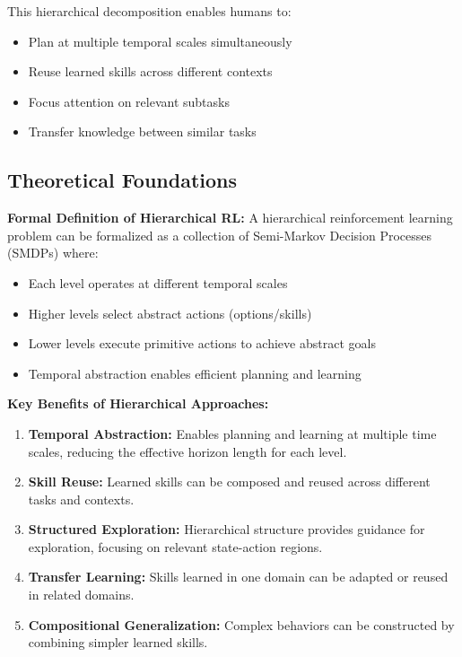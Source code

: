 \documentclass[12pt]{article}
\begin{document}
{{This hierarchical decomposition enables humans to:
\begin{itemize}
    \item Plan at multiple temporal scales simultaneously
    \item Reuse learned skills across different contexts
    \item Focus attention on relevant subtasks
    \item Transfer knowledge between similar tasks
\end{itemize}

\subsection{Theoretical Foundations}

\textbf{Formal Definition of Hierarchical RL:}
A hierarchical reinforcement learning problem can be formalized as a collection of Semi-Markov Decision Processes (SMDPs) where:
\begin{itemize}
    \item Each level operates at different temporal scales
    \item Higher levels select abstract actions (options/skills)
    \item Lower levels execute primitive actions to achieve abstract goals
    \item Temporal abstraction enables efficient planning and learning
\end{itemize}

\textbf{Key Benefits of Hierarchical Approaches:}
\begin{enumerate}
    \item \textbf{Temporal Abstraction:} Enables planning and learning at multiple time scales, reducing the effective horizon length for each level.
    
    \item \textbf{Skill Reuse:} Learned skills can be composed and reused across different tasks and contexts.
    
    \item \textbf{Structured Exploration:} Hierarchical structure provides guidance for exploration, focusing on relevant state-action regions.
    
    \item \textbf{Transfer Learning:} Skills learned in one domain can be adapted or reused in related domains.
    
    \item \textbf{Compositional Generalization:} Complex behaviors can be constructed by combining simpler learned skills.
\end{enumerate}

}}
\end{document}
